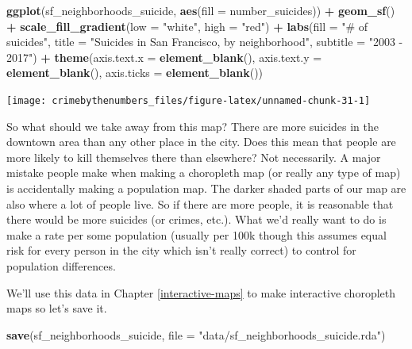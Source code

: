 \documentclass[
  12pt,
]{book}
\newenvironment{Shaded}{\begin{snugshade}}{\end{snugshade}}
\newcommand{\DataTypeTok}[1]{\textcolor[rgb]{0.27,0.27,0.27}{#1}}
\newcommand{\KeywordTok}[1]{\textcolor[rgb]{0.27,0.27,0.27}{\textbf{#1}}}
\newcommand{\NormalTok}[1]{#1}
\newcommand{\OperatorTok}[1]{\textcolor[rgb]{0.43,0.43,0.43}{\textbf{#1}}}
\newcommand{\StringTok}[1]{\textcolor[rgb]{0.5,0.5,0.5}{#1}}
\begin{document}
\begin{Shaded}
\begin{Highlighting}[]
\KeywordTok{ggplot}\NormalTok{(sf\_neighborhoods\_suicide, }\KeywordTok{aes}\NormalTok{(}\DataTypeTok{fill =}\NormalTok{ number\_suicides)) }\OperatorTok{+}
\StringTok{  }\KeywordTok{geom\_sf}\NormalTok{() }\OperatorTok{+}
\StringTok{  }\KeywordTok{scale\_fill\_gradient}\NormalTok{(}\DataTypeTok{low =} \StringTok{"white"}\NormalTok{, }\DataTypeTok{high =} \StringTok{"red"}\NormalTok{) }\OperatorTok{+}
\StringTok{  }\KeywordTok{labs}\NormalTok{(}\DataTypeTok{fill =} \StringTok{"\# of suicides"}\NormalTok{,}
       \DataTypeTok{title =} \StringTok{"Suicides in San Francisco, by neighborhood"}\NormalTok{,}
       \DataTypeTok{subtitle =} \StringTok{"2003 {-} 2017"}\NormalTok{) }\OperatorTok{+}
\StringTok{  }\KeywordTok{theme}\NormalTok{(}\DataTypeTok{axis.text.x =} \KeywordTok{element\_blank}\NormalTok{(),}
        \DataTypeTok{axis.text.y =} \KeywordTok{element\_blank}\NormalTok{(),}
        \DataTypeTok{axis.ticks =} \KeywordTok{element\_blank}\NormalTok{())}
\end{Highlighting}
\end{Shaded}

\begin{center}\texttt{[image: crimebythenumbers\_files/figure-latex/unnamed-chunk-31-1]} \end{center}

So what should we take away from this map? There are more suicides in the downtown area than any other place in the city. Does this mean that people are more likely to kill themselves there than elsewhere? Not necessarily. A major mistake people make when making a choropleth map (or really any type of map) is accidentally making a population map. The darker shaded parts of our map are also where a lot of people live. So if there are more people, it is reasonable that there would be more suicides (or crimes, etc.). What we'd really want to do is make a rate per some population (usually per 100k though this assumes equal risk for every person in the city which isn't really correct) to control for population differences.

We'll use this data in Chapter \ref{interactive-maps} to make interactive choropleth maps so let's save it.

\begin{Shaded}
\begin{Highlighting}[]
\KeywordTok{save}\NormalTok{(sf\_neighborhoods\_suicide, }\DataTypeTok{file =} \StringTok{"data/sf\_neighborhoods\_suicide.rda"}\NormalTok{)}
\end{Highlighting}
\end{Shaded}
\end{document}
